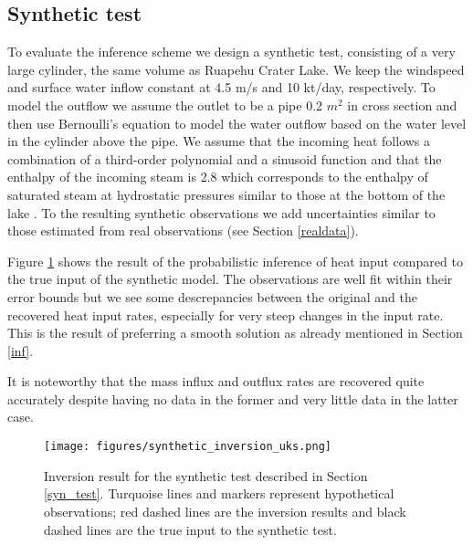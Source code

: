 \documentclass{bmc_template/bmcart}
\begin{document}
\subsection*{Synthetic test}\label{syn_test}
To evaluate the inference scheme we design a synthetic test, consisting of a very
large cylinder, the same volume as Ruapehu Crater Lake. We keep the windspeed
and surface water inflow constant at 4.5 m/s and 10 kt/day, respectively. To
model the outflow we assume the outlet to be a pipe 0.2 $m^2$ in cross section
and then use Bernoulli's equation to model the water outflow based on the water
level in the cylinder above the pipe. We assume that the incoming heat follows
a combination of a third-order polynomial and a sinusoid function and that the
enthalpy of the incoming steam is 2.8 which corresponds to the enthalpy of
saturated steam at hydrostatic pressures similar to those at the bottom of the
lake \cite{Mayhew1978}. To the resulting synthetic observations we add
uncertainties similar to those estimated from real observations (see Section
\ref{realdata}).

Figure \ref{syn_example} shows the result of the probabilistic inference of
heat input compared to the true input of the synthetic model. The observations
are well fit within their error bounds but we see some descrepancies between
the original and the recovered heat input rates, especially for very steep
changes in the input rate. This is the result of preferring a smooth solution
as already mentioned in Section \ref{inf}.

It is noteworthy that the mass influx and outflux rates are recovered
quite accurately despite having no data in the former and very little data
in the latter case.

\begin{figure}
	\texttt{[image: figures/synthetic\_inversion\_uks.png]}  
    \caption{Inversion result for the synthetic test described in Section 
        \ref{syn_test}. Turquoise lines and markers represent hypothetical
        observations; red dashed lines are the inversion results and black
        dashed lines are the true input to the synthetic test.}
  \label{syn_example}
\end{figure}
\end{document}
